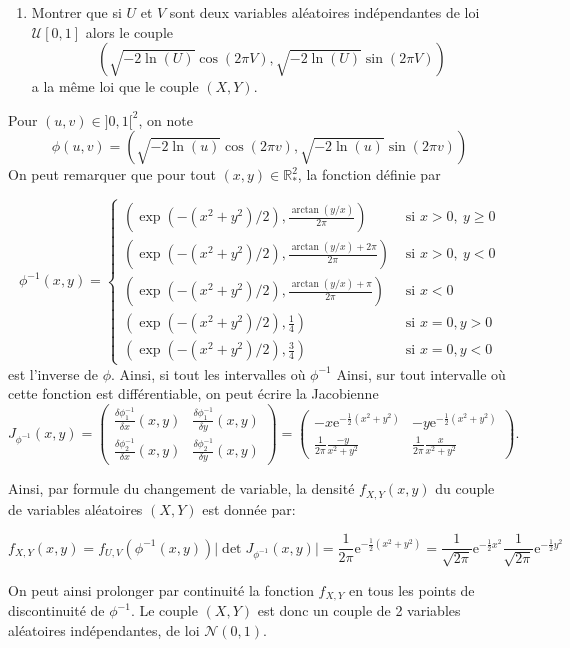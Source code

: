 \documentclass[]{article}
\providecommand{\tightlist}{%
  \setlength{\itemsep}{0pt}\setlength{\parskip}{0pt}}
\newenvironment{Correction}%
  { \vspace{\baselineskip}\begin{mdframed}[backgroundcolor=my_green]}%
  {\end{mdframed}}
\begin{document}
\begin{enumerate}
\def\labelenumi{\arabic{enumi}.}
\tightlist
\item
  Montrer que si \(U\) et \(V\) sont deux variables aléatoires
  indépendantes de loi \(\mathcal{U}[0, 1]\) alors le couple
  \[\left(\sqrt{- 2 \ln(U)} \cos (2\pi V), \sqrt{- 2 \ln(U)} \sin(2\pi V)\right)\]
  a la même loi que le couple \((X, Y)\).
\end{enumerate}

\begin{Correction}
Pour $(u, v) \in ]0,1[^2$, on note 
$$\phi(u, v) = \left(\sqrt{- 2 \ln(u)} \cos (2\pi v), \sqrt{- 2 \ln(u)} \sin(2\pi v)\right)$$
On peut remarquer que pour tout $(x, y) \in \mathbb{R}^2_*$, la fonction définie par

$$\phi^{-1}(x, y) = 
\left\lbrace
\begin{array}{lr}
\left(\exp(-(x^2 + y^2)/2),  \frac{\arctan(y / x)}{2\pi} \right) & \text{ si } x > 0,~ y \geq 0\\
\left(\exp(-(x^2 + y^2)/2),  \frac{\arctan(y / x) + 2\pi}{2\pi} \right) & \text{ si } x > 0,~ y < 0\\
\left(\exp(-(x^2 + y^2)/2),  \frac{\arctan(y / x) + \pi}{2\pi} \right) & \text{ si } x < 0\\
\left(\exp(-(x^2 + y^2)/2),  \frac{1}{4} \right) & \text{ si } x = 0, y > 0\\
\left(\exp(-(x^2 + y^2)/2),  \frac{3}{4} \right) & \text{ si } x = 0, y < 0
\end{array}
\right.$$
est l'inverse de $\phi$. Ainsi, si tout les intervalles où $\phi^{-1}$
Ainsi, sur tout intervalle où cette fonction est différentiable, on peut écrire la Jacobienne
$$J_{\phi^{-1}}(x, y) = \begin{pmatrix}
\frac{\delta \phi^{-1}_1}{\delta x}(x, y) & \frac{\delta \phi^{-1}_1}{\delta y}(x, y)\\
\frac{\delta \phi^{-1}_2}{\delta x}(x, y) & \frac{\delta \phi^{-1}_2}{\delta y}(x, y)
\end{pmatrix}
=
\begin{pmatrix}
-x \text{e}^{-\frac{1}{2}(x ^2 + y^2)} &
-y \text{e}^{-\frac{1}{2}(x ^2 + y^2)} \\
\frac{1}{2\pi}\frac{-y}{x^2 + y ^2} &
\frac{1}{2\pi}\frac{x}{x^2 + y ^2}
\end{pmatrix}.$$

Ainsi, par formule du changement de variable, la densité $f_{X,Y}(x, y)$ du couple de variables aléatoires $(X, Y)$ est donnée par:

$$f_{X,Y}(x, y) = f_{U,V}(\phi^{-1}(x, y))\vert\det J_{\phi^{-1}}(x, y)\vert = \frac{1}{2\pi}\text{e}^{-\frac{1}{2}(x ^2 + y^2)} =  \frac{1}{\sqrt{2\pi}}\text{e}^{-\frac{1}{2}x^2}\frac{1}{\sqrt{2\pi}}\text{e}^{-\frac{1}{2}y^2}$$

On peut ainsi prolonger par continuité la fonction $f_{X, Y}$ en tous les points de discontinuité de $\phi^{-1}$.
Le couple $(X, Y)$ est donc un couple de 2 variables aléatoires indépendantes, de loi $\mathcal{N}(0, 1)$.
\end{Correction}
\end{document}
